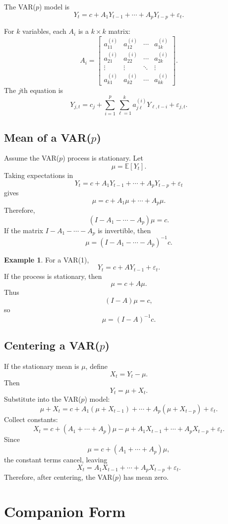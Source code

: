 \documentclass[12pt,oneside]{book}
\numberwithin{equation}{section}
\theoremstyle{definition}
\newtheorem{example}{Example}[section]
\theoremstyle{plain}
\theoremstyle{remark}
\newcommand{\E}{\mathbb{E}}
\begin{document}
The VAR($p$) model is
\[
Y_t
=
c
+
A_1Y_{t-1}
+
\cdots
+
A_pY_{t-p}
+
\varepsilon_t.
\]

For $k$ variables, each $A_i$ is a $k\times k$ matrix:
\[
A_i=
\begin{bmatrix}
a_{11}^{(i)} & a_{12}^{(i)} & \cdots & a_{1k}^{(i)}\\
a_{21}^{(i)} & a_{22}^{(i)} & \cdots & a_{2k}^{(i)}\\
\vdots & \vdots & \ddots & \vdots\\
a_{k1}^{(i)} & a_{k2}^{(i)} & \cdots & a_{kk}^{(i)}
\end{bmatrix}.
\]
The $j$th equation is
\[
Y_{j,t}
=
c_j
+
\sum_{i=1}^p
\sum_{\ell=1}^k
a_{j\ell}^{(i)}Y_{\ell,t-i}
+
\varepsilon_{j,t}.
\]

\subsection{Mean of a VAR($p$)}

Assume the VAR($p$) process is stationary. Let
\[
\mu=\E[Y_t].
\]
Taking expectations in
\[
Y_t
=
c+A_1Y_{t-1}+\cdots+A_pY_{t-p}+\varepsilon_t
\]
gives
\[
\mu
=
c+A_1\mu+\cdots+A_p\mu.
\]
Therefore,
\[
\left(I-A_1-\cdots-A_p\right)\mu=c.
\]
If the matrix $I-A_1-\cdots-A_p$ is invertible, then
\[
\mu
=
\left(I-A_1-\cdots-A_p\right)^{-1}c.
\]

\begin{example}
For a VAR(1),
\[
Y_t=c+AY_{t-1}+\varepsilon_t.
\]
If the process is stationary, then
\[
\mu=c+A\mu.
\]
Thus
\[
(I-A)\mu=c,
\]
so
\[
\mu=(I-A)^{-1}c.
\]
\end{example}

\subsection{Centering a VAR($p$)}

If the stationary mean is $\mu$, define
\[
X_t=Y_t-\mu.
\]
Then
\[
Y_t=\mu+X_t.
\]
Substitute into the VAR($p$) model:
\[
\mu+X_t
=
c
+
A_1(\mu+X_{t-1})
+\cdots+
A_p(\mu+X_{t-p})
+\varepsilon_t.
\]
Collect constants:
\[
X_t
=
c+(A_1+\cdots+A_p)\mu-\mu
+
A_1X_{t-1}
+\cdots+
A_pX_{t-p}
+\varepsilon_t.
\]
Since
\[
\mu=c+(A_1+\cdots+A_p)\mu,
\]
the constant terms cancel, leaving
\[
X_t=A_1X_{t-1}+\cdots+A_pX_{t-p}+\varepsilon_t.
\]
Therefore, after centering, the VAR($p$) has mean zero.

\section{Companion Form}
\end{document}
